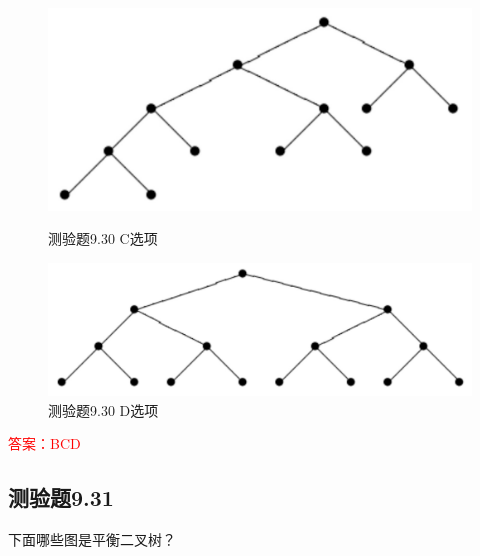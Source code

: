 \documentclass[UTF8, heading=true]{ctexart}
\begin{document}
\begin{figure}[H]
  \centering
  \begin{minipage}[t]{0.29\textwidth}
      \centering
      \includegraphics[width=1\textwidth]{9.30_3.jpg} %
      \vspace{-0.3cm}
      \caption{测验题9.30 C选项}
  \end{minipage}
  \hspace{0.2\textwidth} %
  \begin{minipage}[t]{0.34\textwidth}
      \centering
      \includegraphics[width=1\textwidth]{9.30_4.jpg} %
      \vspace{-0.3cm}
      \caption{测验题9.30 D选项}
\end{minipage}
\end{figure}

\textcolor{red}{答案：BCD}

\subsection{测验题9.31}

下面哪些图是平衡二叉树？
\end{document}
